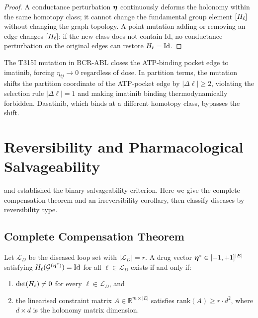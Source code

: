 \begin{proof}
A conductance perturbation $\boldsymbol{\eta}$ continuously deforms the holonomy within
the same homotopy class; it cannot change the fundamental group element
$[H_\ell]$ without changing the graph topology.  A point mutation adding or
removing an edge changes $[H_\ell]$: if the new class does not contain
$\mathrm{Id}$, no conductance perturbation on the original edges can restore
$H_\ell = \mathrm{Id}$.
\end{proof}

\begin{example}
\label{ex:ch09-t315i}
The T315I mutation in BCR-ABL closes the ATP-binding pocket edge to imatinib,
forcing $\eta_{ij} \to 0$ regardless of dose.  In partition terms, the
mutation shifts the partition coordinate of the ATP-pocket edge by
$|\Delta\ell| \geq 2$, violating the selection rule $|\Delta\ell|=1$ and
making imatinib binding thermodynamically forbidden.  Dasatinib, which binds
at a different homotopy class, bypasses the shift.
\end{example}

\section{Reversibility and Pharmacological Salvageability}
\label{sec:ch09-reversibility-ext}

 and  established the binary
salvageability criterion.  Here we give the complete compensation theorem and
an irreversibility corollary, then classify diseases by reversibility type.

\subsection{Complete Compensation Theorem}
\label{subsec:ch09-compensation}

\begin{theorem}
\label{thm:ch09-compensation}
Let $\mathcal{L}_D$ be the diseased loop set with $|\mathcal{L}_D| = r$.
A drug vector $\boldsymbol{\eta}^* \in [-1,+1]^{|E|}$ satisfying
$H_\ell(\mathcal{G}^{(\boldsymbol{\eta}^*)}) = \mathrm{Id}$ for all $\ell \in \mathcal{L}_D$
exists if and only if:
\begin{enumerate}[label=(\roman*)]
  \item $\det(H_\ell) \neq 0$ for every $\ell \in \mathcal{L}_D$, and
  \item the linearised constraint matrix $A \in \mathbb{R}^{m \times |E|}$
    satisfies $\mathrm{rank}(A) \geq r\cdot d^2$, where $d\times d$ is the
    holonomy matrix dimension.
\end{enumerate}
\end{theorem}

